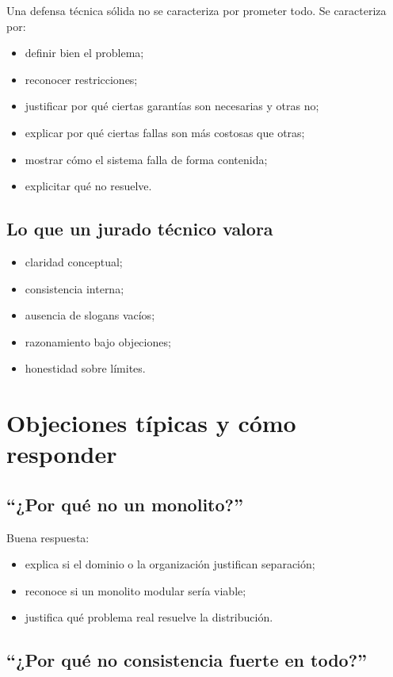 \documentclass[variant=apuntes,cover=institutional,mode=screen]{ua-engineering-v6-article}
\begin{document}
Una defensa técnica sólida no se caracteriza por prometer todo. Se caracteriza por:

\begin{itemize}
\item definir bien el problema;
\item reconocer restricciones;
\item justificar por qué ciertas garantías son necesarias y otras no;
\item explicar por qué ciertas fallas son más costosas que otras;
\item mostrar cómo el sistema falla de forma contenida;
\item explicitar qué no resuelve.
\end{itemize}

\subsection{Lo que un jurado técnico valora}

\begin{itemize}
\item claridad conceptual;
\item consistencia interna;
\item ausencia de slogans vacíos;
\item razonamiento bajo objeciones;
\item honestidad sobre límites.
\end{itemize}

\section{Objeciones típicas y cómo responder}

\subsection{“¿Por qué no un monolito?”}

Buena respuesta:
\begin{itemize}
\item explica si el dominio o la organización justifican separación;
\item reconoce si un monolito modular sería viable;
\item justifica qué problema real resuelve la distribución.
\end{itemize}

\subsection{“¿Por qué no consistencia fuerte en todo?”}
\end{document}

